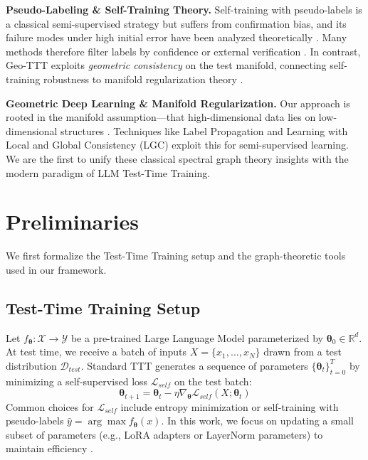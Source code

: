 \documentclass{article}
\theoremstyle{plain}
\theoremstyle{definition}
\theoremstyle{remark}
\newcommand{\R}{\mathbb{R}}
\newcommand{\ThetaParam}{\boldsymbol{\theta}}
\newcommand{\loss}{\mathcal{L}}
\begin{document}
\textbf{Pseudo-Labeling \& Self-Training Theory.}
Self-training with pseudo-labels \cite{yaroslavsky2010selftraining, lee2013pseudolabel} is a classical semi-supervised strategy but suffers from confirmation bias, and its failure modes under high initial error have been analyzed theoretically \cite{kumar2024consistency, chen2024understanding}. Many methods therefore filter labels by confidence or external verification \cite{sohn2020fixmatch, corepo2025, verifymatch2024}. In contrast, Geo-TTT exploits \emph{geometric consistency} on the test manifold, connecting self-training robustness to manifold regularization theory \cite{belkin2006manifoldreg, chapelle2006ssl}.


\textbf{Geometric Deep Learning \& Manifold Regularization.}
Our approach is rooted in the manifold assumption—that high-dimensional data lies on low-dimensional structures \cite{tenenbaum2000isomap, belkin2003laplacian}. Techniques like Label Propagation \cite{zhu2003lp} and Learning with Local and Global Consistency (LGC) \cite{zhou2004lgc} exploit this for semi-supervised learning. We are the first to unify these classical spectral graph theory insights \cite{bronstein2017geometric, kipf2017gcn} with the modern paradigm of LLM Test-Time Training.

\section{Preliminaries}
\label{sec:preliminaries}

We first formalize the Test-Time Training setup and the graph-theoretic tools used in our framework.

\subsection{Test-Time Training Setup}
Let $f_{\ThetaParam}: \mathcal{X} \to \mathcal{Y}$ be a pre-trained Large Language Model parameterized by $\ThetaParam_0 \in \R^d$. At test time, we receive a batch of inputs $X = \{x_1, \dots, x_N\}$ drawn from a test distribution $\mathcal{D}_{test}$.
Standard TTT generates a sequence of parameters $\{\ThetaParam_t\}_{t=0}^T$ by minimizing a self-supervised loss $\loss_{self}$ on the test batch:
\begin{equation}
    \ThetaParam_{t+1} = \ThetaParam_t - \eta \nabla_{\ThetaParam} \loss_{self}(X; \ThetaParam_t)
\end{equation}
Common choices for $\loss_{self}$ include entropy minimization or self-training with pseudo-labels $\hat{y} = \arg\max f_{\ThetaParam}(x)$. In this work, we focus on updating a small subset of parameters (e.g., LoRA adapters or LayerNorm parameters) to maintain efficiency \cite{sun2023learning, tlm2025}.
\end{document}
